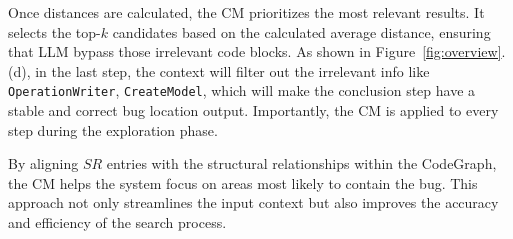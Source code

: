 Once distances are calculated, the CM prioritizes the most relevant results. It selects the top-$k$ candidates based on the calculated average distance, ensuring that LLM bypass those irrelevant code blocks. 
As shown in Figure~\ref{fig:overview}. (d), in the last step, the context will filter out the irrelevant info like \texttt{OperationWriter}, \texttt{CreateModel}, which will make the conclusion step have a stable and correct bug location output. 
Importantly, the CM is applied to every step during the exploration phase. 

By aligning $SR$ entries with the structural relationships within the CodeGraph, the CM helps the system focus on areas most likely to contain the bug. This approach not only streamlines the input context but also improves the accuracy and efficiency of the search process.



